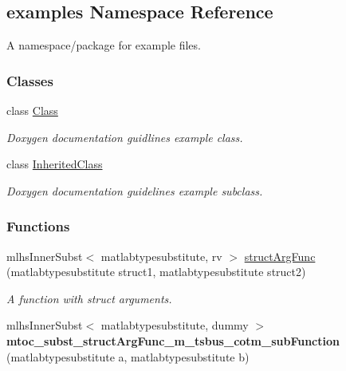 \hypertarget{namespaceexamples}{}\subsection{examples Namespace Reference}
\label{namespaceexamples}


A namespace/package for example files.  


\subsubsection*{Classes}
\begin{DoxyCompactItemize}
\item 
class \hyperlink{classexamples_1_1_class}{Class}
\begin{DoxyCompactList}\small\item\em Doxygen documentation guidlines example class. \end{DoxyCompactList}\item 
class \hyperlink{classexamples_1_1_inherited_class}{Inherited\+Class}
\begin{DoxyCompactList}\small\item\em Doxygen documentation guidelines example subclass. \end{DoxyCompactList}\end{DoxyCompactItemize}
\subsubsection*{Functions}
\begin{DoxyCompactItemize}
\item 
mlhs\+Inner\+Subst$<$ matlabtypesubstitute, rv $>$ \hyperlink{namespaceexamples_aef64505e96291653ab0deb5ddb0f5954}{struct\+Arg\+Func} (matlabtypesubstitute struct1, matlabtypesubstitute struct2)
\begin{DoxyCompactList}\small\item\em A function with struct arguments. \end{DoxyCompactList}\item 
\hypertarget{namespaceexamples_aa88eb6ace9cbb46430873dbc5d5cf1de}{}mlhs\+Inner\+Subst$<$ matlabtypesubstitute, dummy $>$ {\bfseries mtoc\+\_\+subst\+\_\+struct\+Arg\+Func\+\_\+m\+\_\+tsbus\+\_\+cotm\+\_\+sub\+Function} (matlabtypesubstitute a, matlabtypesubstitute b)\label{namespaceexamples_aa88eb6ace9cbb46430873dbc5d5cf1de}

\end{DoxyCompactItemize}


